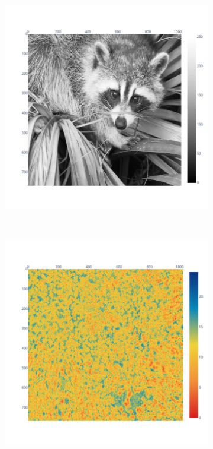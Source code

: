 \documentclass[11pt]{article}
\begin{document}
\begin{figure}
\centering
\begin{subfigure}{.3\linewidth}
    \includegraphics[width=\linewidth]{figure/bspline/original_image.png}
    \caption{}
    \label{fig:bspline_input}
\end{subfigure}\\
\begin{subfigure}{0.3\linewidth}
    \includegraphics[width=\linewidth]{figure/bspline/bisplev_ret_sig_portland_r.png}

\end{subfigure}
\end{figure}
\end{document}
